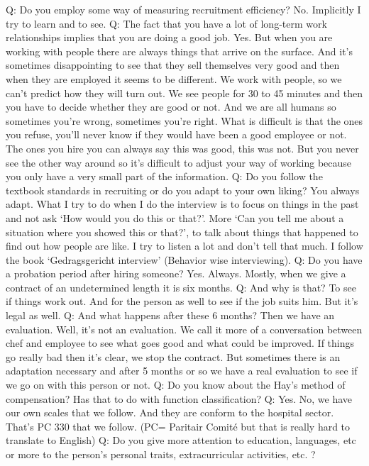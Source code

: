 \documentclass[a4paper,fleqn,11pt,dvips,titlepage]{article}
\numberwithin{figure}{section}
\numberwithin{equation}{section}
\begin{document}
Q: Do you employ some way of measuring recruitment efficiency? 
No. Implicitly I try to learn and to see. 
Q: The fact that you have a lot of long-term work relationships implies that you are doing a good job.
Yes. But when you are working with people there are always things that arrive on the surface. And it’s sometimes disappointing to see that they sell themselves very good and then when they are employed it seems to be different. We work with people, so we can’t predict how they will turn out. We see people for 30 to 45 minutes and then you have to decide whether they are good or not. And we are all humans so sometimes you’re wrong, sometimes you’re right. What is difficult is that the ones you refuse, you’ll never know if they would have been a good employee or not. The ones you hire you can always say this was good, this was not. But you never see the other way around so it’s difficult to adjust your way of working because you only have a very small part of the information. 
Q: Do you follow the textbook standards in recruiting or do you adapt to your own liking? 
You always adapt. What I try to do when I do the interview is to focus on things in the past and not ask ‘How would you do this or that?’. More ‘Can you tell me about a situation where you showed this or that?’, to talk about things that happened to find out how people are like. I try to listen a lot and don’t tell that much. I follow the book ‘Gedragsgericht interview’ (Behavior wise interviewing).
Q: Do you have a probation period after hiring someone? 
Yes. Always. Mostly, when we give a contract of an undetermined length it is six months. 
Q: And why is that?
To see if things work out. And for the person as well to see if the job suits him. But it’s legal as well. 
Q: And what happens after these 6 months? 
Then we have an evaluation. Well, it’s not an evaluation. We call it more of a conversation between chef and employee to see what goes good and what could be improved. If things go really bad then it’s clear, we stop the contract. But sometimes there is an adaptation necessary and after 5 months or so we have a real evaluation to see if we go on with this person or not. 
Q: Do you know about the Hay’s method of compensation?
Has that to do with function classification?
Q: Yes. 
No, we have our own scales that we follow. And they are conform to the hospital sector. That’s PC 330 that we follow. (PC= Paritair Comité but that is really hard to translate to English) 
Q: Do you give more attention to education, languages, etc or more to the person’s personal traits, extracurricular activities, etc. ?
\end{document}
